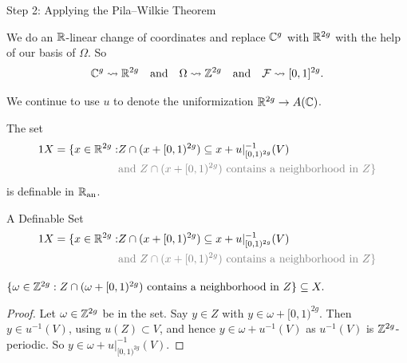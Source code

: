 \documentclass{beamer}
\begin{document}
\begin{frame}{Step 2: Applying the Pila--Wilkie Theorem}


  We do an ${\mathbb{R}}$-linear change of coordinates and
  replace ${\mathbb{C}}^g$ with ${\mathbb{R}}^{2g}$ with the help of our basis of
  $\Omega$. So
  \begin{equation*}
    {\mathbb{C}}^g\leadsto {\mathbb{R}}^{2g}\quad\text{and}\quad
    \Omega \leadsto {\mathbb{Z}}^{2g} \quad\text{and}\quad {\mathcal F} \leadsto
    [0,1]^{2g}.
  \end{equation*}  

  We continue to use $u$ to denote the uniformization ${\mathbb{R}}^{2g}
  \rightarrow A({\mathbb{C}})$.
  
  The set
  \begin{alignat*}1  
    X =  \{x \in\IR^{2g} : & Z\cap (x+[0,1)^{2g}) \subset x+u|_{[0,1)^{2g}}^{-1}(V)\\
    &\color{gray}{\text{and } Z\cap(x+[0,1)^{2g})\text{ contains a
        neighborhood in $Z$}}
    \}
  \end{alignat*}
  is definable in ${{\mathbb{R}}_{\mathrm{an}}}$.
   
\end{frame}

\begin{frame}{A Definable Set} 
  \begin{alignat*}1  
    X =  \{x \in\IR^{2g} : & Z\cap (x+[0,1)^{2g}) \subset x+u|_{[0,1)^{2g}}^{-1}(V)\\
    &\color{gray}{\text{and } Z\cap(x+[0,1)^{2g})\text{ contains a
        neighborhood in $Z$}}
    \}
  \end{alignat*}
  
  \begin{lemma}
    $\{\omega\in{\mathbb{Z}}^{2g} :    Z\cap (\omega+[0,1)^{2g})\text{
      contains a neighborhood in $Z$}\} \subseteq X.$
  \end{lemma}
  \begin{proof}
    Let $\omega \in{\mathbb{Z}}^{2g}$ be in the set. 
    Say $y\in Z$ with $y\in \omega+[0,1)^{2g}$. Then $y\in
    u^{-1}(V)$, using $u(Z)\subset V$, and hence $y \in \omega+u^{-1}(V)$
    as $u^{-1}(V)$ is ${\mathbb{Z}}^{2g}$-periodic. So $y \in
    \omega+u|_{[0,1)^{2g}}^{-1}(V)$.
  \end{proof}  
\end{frame}
\end{document}
